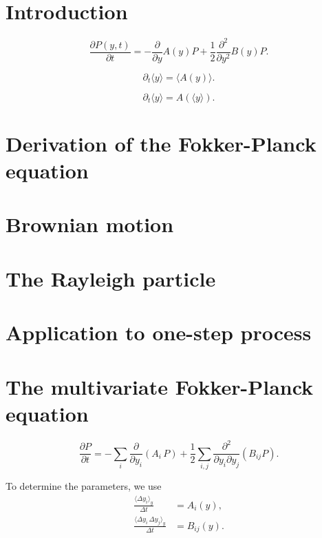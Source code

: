 \documentclass{book}
\numberwithin{equation}{section}
\theoremstyle{plain}
\theoremstyle{definition}
\theoremstyle{remark}
\begin{document}
\section{Introduction}

\begin{equation}
  \frac{ \partial P(y, t) }  { \partial t }
=
-\frac{\partial } {\partial y} A(y) P
+\frac{1}{2} \frac{ \partial^2 } { \partial y^2 } B(y) P.
\tag{1.1}
\end{equation}


\begin{equation}
\partial_t \langle y \rangle
= \langle A(y) \rangle.
\tag{1.7}
\end{equation}

$$
\partial_t \langle y \rangle
= A(\langle y \rangle).
$$

\section{Derivation of the Fokker-Planck equation}

\section{Brownian motion}

\section{The Rayleigh particle}

\section{Application to one-step process}

\section{The multivariate Fokker-Planck equation}

\begin{equation}
\frac{ \partial P } { \partial t }
=
-\sum_i \frac{ \partial } { \partial y_i } (A_i \, P)
+ \frac 1 2
\sum_{i, j} \frac{ \partial^2 } { \partial y_i \partial y_j } (B_{ij} P ).
\tag{6.1}
\end{equation}

To determine the parameters, we use
\begin{equation}
\begin{aligned}
\frac{ \langle \Delta y_i \rangle_y } { \Delta t }
&=
A_i(y), \\
\frac{ \langle \Delta y_i \, \Delta y_j \rangle_y } { \Delta t }
&=
B_{ij}(y).
\end{aligned}
\tag{6.3}
\end{equation}
\end{document}
